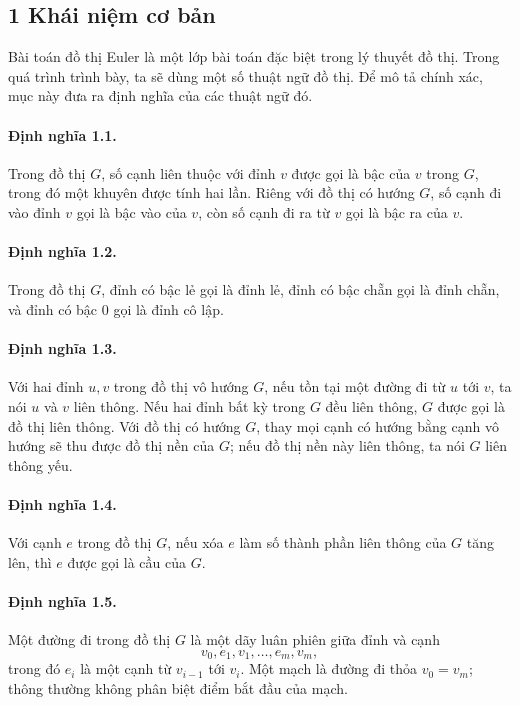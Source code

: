 \documentclass[11pt]{article}
\begin{document}
\subsection*{1 Khái niệm cơ bản}

Bài toán đồ thị Euler là một lớp bài toán đặc biệt trong lý thuyết đồ thị.
Trong quá trình trình bày, ta sẽ dùng một số thuật ngữ đồ thị. Để mô tả chính
xác, mục này đưa ra định nghĩa của các thuật ngữ đó.

\paragraph{Định nghĩa 1.1.}
Trong đồ thị \(G\), số cạnh liên thuộc với đỉnh \(v\) được gọi là bậc của
\(v\) trong \(G\), trong đó một khuyên được tính hai lần. Riêng với đồ thị có
hướng \(G\), số cạnh đi vào đỉnh \(v\) gọi là bậc vào của \(v\), còn số cạnh
đi ra từ \(v\) gọi là bậc ra của \(v\).

\paragraph{Định nghĩa 1.2.}
Trong đồ thị \(G\), đỉnh có bậc lẻ gọi là đỉnh lẻ, đỉnh có bậc chẵn gọi là
đỉnh chẵn, và đỉnh có bậc \(0\) gọi là đỉnh cô lập.

\paragraph{Định nghĩa 1.3.}
Với hai đỉnh \(u,v\) trong đồ thị vô hướng \(G\), nếu tồn tại một đường đi từ
\(u\) tới \(v\), ta nói \(u\) và \(v\) liên thông. Nếu hai đỉnh bất kỳ trong
\(G\) đều liên thông, \(G\) được gọi là đồ thị liên thông. Với đồ thị có hướng
\(G\), thay mọi cạnh có hướng bằng cạnh vô hướng sẽ thu được đồ thị nền của
\(G\); nếu đồ thị nền này liên thông, ta nói \(G\) liên thông yếu.

\paragraph{Định nghĩa 1.4.}
Với cạnh \(e\) trong đồ thị \(G\), nếu xóa \(e\) làm số thành phần liên thông
của \(G\) tăng lên, thì \(e\) được gọi là cầu của \(G\).

\paragraph{Định nghĩa 1.5.}
Một đường đi trong đồ thị \(G\) là một dãy luân phiên giữa đỉnh và cạnh
\[
  v_0,e_1,v_1,\ldots,e_m,v_m,
\]
trong đó \(e_i\) là một cạnh từ \(v_{i-1}\) tới \(v_i\). Một mạch là đường đi
thỏa \(v_0=v_m\); thông thường không phân biệt điểm bắt đầu của mạch.
\end{document}
